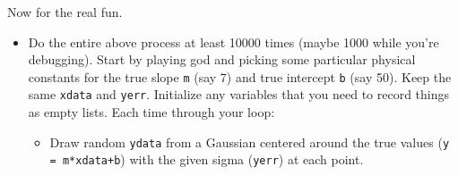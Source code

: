\documentclass[11pt]{hmcpset}
\begin{document}
\begin{problem}
	
	Now for the real fun. 
	\begin{itemize}
		\item Do the entire above process at least 10000 times (maybe 1000 while you're debugging). Start by playing god and picking some particular physical constants for the true slope \texttt{m} (say 7) and true intercept \texttt{b} (say 50). Keep the same \texttt{xdata} and \texttt{yerr}. Initialize any variables that you need to record things as empty lists. Each time through your loop:
		\begin{itemize}
			\item Draw random \texttt{ydata} from a Gaussian centered around the true values (\texttt{y = m*xdata+b}) with the given sigma (\texttt{yerr}) at each point.
			

\end{itemize}
\end{itemize}
\end{problem}
\end{document}
